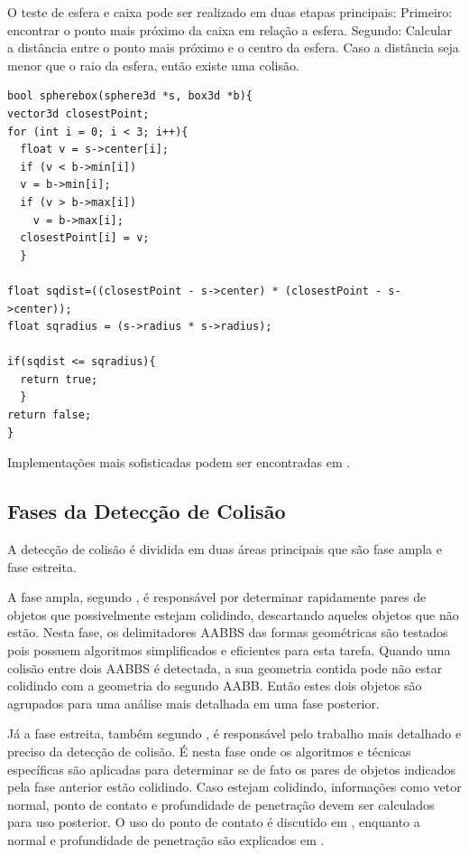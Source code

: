 O teste de esfera e caixa pode ser realizado em duas etapas principais:
Primeiro: encontrar o ponto mais próximo da caixa em relação a esfera.
Segundo: Calcular a distância entre o ponto mais próximo e o centro da esfera.
Caso a distância seja menor que o raio da esfera, então existe uma colisão.

\begin{lstlisting}[frame=single,caption=Colisão entre esfera e caixa\label{code:collisionSphereBox}]
bool spherebox(sphere3d *s, box3d *b){
vector3d closestPoint;
for (int i = 0; i < 3; i++){
  float v = s->center[i];
  if (v < b->min[i])
  v = b->min[i];  
  if (v > b->max[i])
    v = b->max[i];
  closestPoint[i] = v;
  }
  
float sqdist=((closestPoint - s->center) * (closestPoint - s->center));
float sqradius = (s->radius * s->radius);

if(sqdist <= sqradius){
  return true;
  }
return false;
}
\end{lstlisting}

Implementações mais sofisticadas podem ser encontradas em .

	\subsection{Fases da Detecção de Colisão}
A detecção de colisão é dividida em duas áreas principais que são fase ampla e fase estreita.

A fase ampla, segundo , é responsável por determinar rapidamente pares de objetos que possivelmente estejam colidindo, descartando aqueles objetos que não estão.
Nesta fase, os delimitadores AABBS das formas geométricas são testados pois possuem algoritmos simplificados e eficientes para esta tarefa.
Quando uma colisão entre dois AABBS é detectada, a sua geometria contida pode não estar colidindo com a geometria do segundo AABB. Então estes dois objetos são agrupados para uma análise mais detalhada em uma fase posterior.

Já a fase estreita, também segundo ,  é responsável pelo trabalho mais detalhado e preciso da detecção de colisão.
É nesta fase onde os algoritmos e técnicas específicas são aplicadas para determinar se de fato os pares de objetos indicados pela fase anterior estão colidindo.
Caso estejam colidindo, informações como vetor normal, ponto de contato e profundidade de penetração devem ser calculados para uso posterior.
O uso do ponto de contato é discutido em , enquanto a normal e profundidade de penetração são explicados em .
